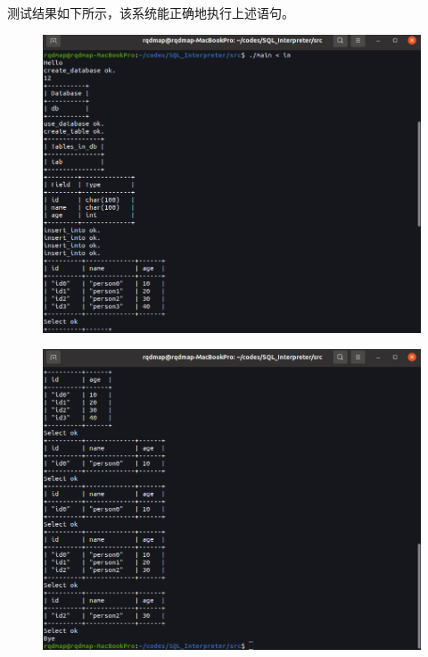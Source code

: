 \documentclass{article}
\begin{document}
\begin{spacing}{2}
    测试结果如下所示，该系统能正确地执行上述语句。
    \begin{figure}[h]
    \includegraphics[width=1\textwidth]{out1.png}
    \end{figure}

    \begin{figure}[h]
    \includegraphics[width=1\textwidth]{out2.png}
    \end{figure}    


\end{spacing}
\end{document}
